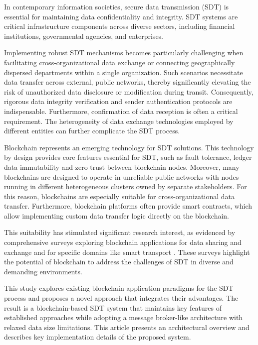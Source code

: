 \documentclass[10pt]{llncs}
\begin{document}
In contemporary information societies, secure data transmission (SDT) is essential for maintaining data confidentiality and integrity.
SDT systems are critical infrastructure components across diverse sectors, including financial institutions, governmental agencies, and enterprises.

Implementing robust SDT mechanisms becomes particularly challenging when facilitating cross-organizational data exchange or connecting geographically dispersed departments within a single organization.
Such scenarios necessitate data transfer across external, public networks, thereby significantly elevating the risk of unauthorized data disclosure or modification during transit.
Consequently, rigorous data integrity verification and sender authentication protocols are indispensable.
Furthermore, confirmation of data reception is often a critical requirement.
The heterogeneity of data exchange technologies employed by different entities can further complicate the SDT process.

Blockchain represents an emerging technology for SDT solutions.
This technology by design provides core features essential for SDT, such as fault tolerance, ledger data immutability and zero trust between blockchain nodes.
Moreover, many blockchains are designed to operate in unreliable public networks with nodes running in different heterogeneous clusters owned by separate stakeholders.
For this reason, blockchains are especially suitable for cross-organizational data transfer.
Furthermore, blockchain platforms often provide smart contracts, which allow implementing custom data transfer logic directly on the blockchain.

This suitability has stimulated significant research interest, as evidenced by comprehensive surveys exploring blockchain applications for data sharing and exchange \cite{Song2023} and for specific domains like smart transport \cite{Bagga2022}.
These surveys highlight the potential of blockchain to address the challenges of SDT in diverse and demanding environments.

This study explores existing blockchain application paradigms for the SDT process and proposes a novel approach that integrates their advantages. 
The result is a blockchain-based SDT system that maintains key features of established approaches while adopting a message broker-like architecture with relaxed data size limitations. 
This article presents an architectural overview and describes key implementation details of the proposed system.
\end{document}

